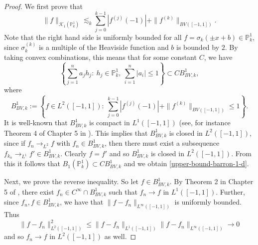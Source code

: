 \begin{proof}
 We first prove that 
 \begin{equation}\label{upper-bound-barron-1-d}
  \|f\|_{\mathcal{K}_1(\mathbb{P}^1_k)} \lesssim_k \sum_{j=0}^{k-1} |f^{(j)}(-1)| + \|f^{(k)}\|_{BV([-1,1])}. 
 \end{equation}
Note that the right hand side is uniformly bounded for all $f = \sigma_k(\pm x + b)\in \mathbb{P}^1_k$, since $\sigma_k^{(k)}$ is a multiple of the Heaviside function and $b$ is bounded by $2$. By taking convex combinations, this means that for some constant $C$, we have
\begin{equation}
 \left\{\sum_{j=1}^n a_jh_j:~h_j\in \mathbb{P}^1_k,~\sum_{i=1}^n|a_i|\leq 1\right\} \subset CB^1_{BV,k},
\end{equation}
where
\begin{equation}
 B^1_{BV,k}:=\left\{f\in L^2([-1,1]):~\sum_{j=0}^{k-1} |f^{(j)}(-1)| + \|f^{(k)}\|_{BV([-1,1])} \leq 1\right\}.
\end{equation}
It is well-known that $B^1_{BV,k}$ is compact in $L^1([-1,1])$ (see, for instance Theorem 4 of Chapter 5 in \cite{evans2015measure}). This implies that $B^1_{BV,k}$ is closed in $L^2([-1,1])$, since if $f_n\rightarrow_{L^2} f$ with $f_n\in B^1_{BV,k}$, then there must exist a subsequence $f_{k_n}\rightarrow_{L^1} f'\in B^1_{BV,k}$. Clearly $f=f'$ and so $B^1_{BV,k}$ is closed in $L^2([-1,1])$. From this it follows that $B_1(\mathbb{P}^1_k) \subset CB^1_{BV,k}$ and we obtain \eqref{upper-bound-barron-1-d}. 

Next, we prove the reverse inequality. So let $f\in B^1_{BV,k}$. By Theorem 2 in Chapter 5 of \cite{evans2015measure}, there exist $f_n\in C^\infty\cap B^1_{BV,k}$ such that $f_n\rightarrow f$ in $L^1([-1,1])$. Further, since $f_n,f\in B^1_{BV,k}$, we have that $\|f - f_n\|_{L^\infty([-1,1])}$ is uniformly bounded. Thus $$\|f - f_n\|^2_{L^2([-1,1])} \leq \|f - f_n\|_{L^1([-1,1])}\|f - f_n\|_{L^\infty([-1,1])} \rightarrow 0$$
and so $f_n\rightarrow f$ in $L^2([-1,1])$ as well.


\end{proof}
